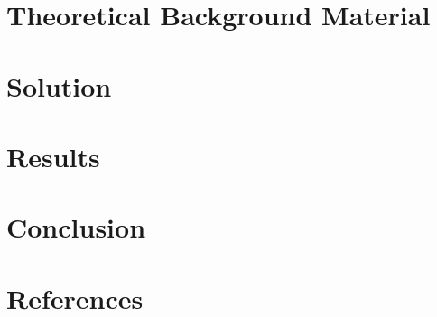\documentclass{article}
\begin{document}
\section{Theoretical Background Material}


\section{Solution}


\section{Results}


\section{Conclusion}


\section{References}

\end{document}
